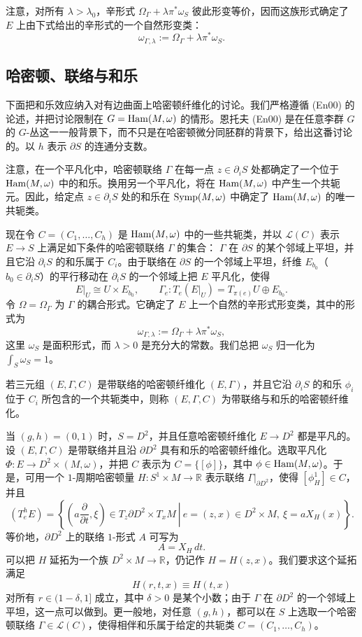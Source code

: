 注意，对所有 $\lambda>\lambda_0$，辛形式
$\Omega_\Gamma+\lambda\pi^*\omega_S$ 彼此形变等价，因而这族形式确定了
$E$ 上由下式给出的辛形式的一个自然形变类：
\[
 \omega_{\Gamma,\lambda}:=\Omega_\Gamma+\lambda\pi^*\omega_S.
\]

\subsection{哈密顿、联络与和乐}
\label{subsec:hamiltonian-connection-holonomy}

下面把和乐效应纳入对有边曲面上哈密顿纤维化的讨论。我们严格遵循
(En00) 的论述，并把讨论限制在 $G=\operatorname{Ham}(M,\omega)$ 的情形。恩托夫
(En00) 是在任意李群 $G$ 的 $G$-丛这一一般背景下，而不只是在哈密顿微分同胚群的背景下，给出这番讨论的。以 $h$ 表示 $\partial S$ 的连通分支数。

注意，在一个平凡化中，哈密顿联络 $\Gamma$ 在每一点
$z\in\partial_iS$ 处都确定了一个位于 $\operatorname{Ham}(M,\omega)$ 中的和乐。换用另一个平凡化，将在 $\operatorname{Ham}(M,\omega)$ 中产生一个共轭元。因此，给定点
$z\in\partial_iS$ 处的和乐在 $\operatorname{Symp}(M,\omega)$ 中确定了
$\operatorname{Ham}(M,\omega)$ 的唯一共轭类。

现在令 $C=(C_1,\ldots,C_h)$ 是 $\operatorname{Ham}(M,\omega)$ 中的一些共轭类，并以
$\mathcal L(C)$ 表示 $E\to S$ 上满足如下条件的哈密顿联络 $\Gamma$ 的集合：
$\Gamma$ 在 $\partial S$ 的某个邻域上平坦，并且它沿 $\partial_iS$ 的和乐属于
$C_i$。由于联络在 $\partial S$ 的一个邻域上平坦，纤维
$E_{b_0}$（$b_0\in\partial_iS$）的平行移动在 $\partial_iS$ 的一个邻域上把
$E$ 平凡化，使得
\[
 E|_U\cong U\times E_{b_0},
 \qquad
 \Gamma_e:T_e(E|_U)=T_{\pi(e)}U\oplus E_{b_0}.
\]
令 $\Omega=\Omega_\Gamma$ 为 $\Gamma$ 的耦合形式。它确定了 $E$ 上一个自然的辛形式形变类，其中的形式为
\[
 \omega_{\Gamma,\lambda}:=\Omega_\Gamma+\lambda\pi^*\omega_S,
\]
这里 $\omega_S$ 是面积形式，而 $\lambda>0$ 是充分大的常数。我们总把
$\omega_S$ 归一化为 $\int_S\omega_S=1$。

\begin{definition}\label{def:hamiltonian-fibration-connection-holonomy}
若三元组 $(E,\Gamma,C)$ 是带联络的哈密顿纤维化 $(E,\Gamma)$，并且它沿
$\partial_iS$ 的和乐 $\phi_i$ 位于 $C_i$ 所包含的一个共轭类中，则称
$(E,\Gamma,C)$ 为带联络与和乐的哈密顿纤维化。
\end{definition}

当 $(g,h)=(0,1)$ 时，$S=D^2$，并且任意哈密顿纤维化
$E\to D^2$ 都是平凡的。设 $(E,\Gamma,C)$ 是带联络并且沿
$\partial D^2$ 具有和乐的哈密顿纤维化。选取平凡化
$\Phi:E\to D^2\times(M,\omega)$，并把 $C$ 表示为
$C=\{[\phi]\}$，其中 $\phi\in\operatorname{Ham}(M,\omega)$。于是，可用一个
$1$-周期哈密顿量 $H:S^1\times M\to\mathbb R$ 表示联络
$\Gamma|_{\partial D^2}$，使得 $[\phi_H^1]\in C$，并且
\[
 (T_e^hE)=
 \left\{
  \left.\left(a\frac{\partial}{\partial t},\xi\right)
  \in T_z\partial D^2\times T_xM\ \right|\
  e=(z,x)\in D^2\times M,\ \xi=aX_H(x)
 \right\}.
\]
等价地，$\partial D^2$ 上的联络 $1$-形式 $A$ 可写为
\[
 A=X_H\,dt.
\]
可以把 $H$ 延拓为一个族 $D^2\times M\to\mathbb R$，仍记作
$H=H(z,x)$。我们要求这个延拓满足
\[
 H(r,t,x)\equiv H(t,x)
\]
对所有 $r\in(1-\delta,1]$ 成立，其中 $\delta>0$ 是某个小数；由于
$\Gamma$ 在 $\partial D^2$ 的一个邻域上平坦，这一点可以做到。更一般地，对任意 $(g,h)$，都可以在 $S$ 上选取一个哈密顿联络
$\Gamma\in\mathcal L(C)$，使得相伴和乐属于给定的共轭类
$C=(C_1,\ldots,C_h)$。

